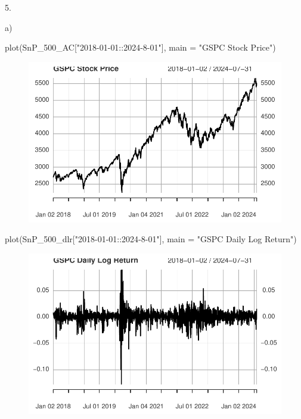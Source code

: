 \documentclass[
  letterpaper,
  DIV=11,
  numbers=noendperiod]{scrartcl}
\newenvironment{Shaded}{\begin{snugshade}}{\end{snugshade}}
\newcommand{\AttributeTok}[1]{\textcolor[rgb]{0.40,0.45,0.13}{#1}}
\newcommand{\FunctionTok}[1]{\textcolor[rgb]{0.28,0.35,0.67}{#1}}
\newcommand{\NormalTok}[1]{\textcolor[rgb]{0.00,0.23,0.31}{#1}}
\newcommand{\StringTok}[1]{\textcolor[rgb]{0.13,0.47,0.30}{#1}}
\begin{document}
5.

a)

\begin{Shaded}
\begin{Highlighting}[]
\FunctionTok{plot}\NormalTok{(SnP\_500\_AC[}\StringTok{"2018{-}01{-}01::2024{-}8{-}01"}\NormalTok{], }\AttributeTok{main =} \StringTok{"GSPC Stock Price"}\NormalTok{)}
\end{Highlighting}
\end{Shaded}

\begin{figure}[H]

{\centering \includegraphics{homework_1_files/figure-pdf/unnamed-chunk-11-1.pdf}

}

\end{figure}

\begin{Shaded}
\begin{Highlighting}[]
\FunctionTok{plot}\NormalTok{(SnP\_500\_dlr[}\StringTok{"2018{-}01{-}01::2024{-}8{-}01"}\NormalTok{], }\AttributeTok{main =} \StringTok{"GSPC Daily Log Return"}\NormalTok{)}
\end{Highlighting}
\end{Shaded}

\begin{figure}[H]

{\centering \includegraphics{homework_1_files/figure-pdf/unnamed-chunk-11-2.pdf}

}

\end{figure}
\end{document}
